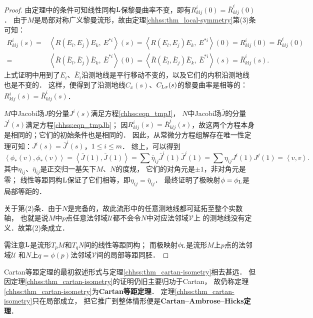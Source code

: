 \begin{proof}
     由定理中的条件可知线性同构$\rm L$保黎曼曲率不变，即有$R^i_{klj}(0)=\bar{R}^i_{klj}(0)$．
    由于$M$是{\kaishu 局部对称}广义黎曼流形，故由定理\ref{chhss:thm_local-symmetry}第(3)条可知：
    \begin{align*}
        R^i_{klj}(s)=&\left<R(E_l,E_j)E_k,\ E^{*i}\right>(s)=\left<R(E_l,E_j)E_k,\ E^{*i}\right>(0)
        =R^i_{klj}(0)=\bar{R}^i_{klj}(0) \\
        =&\left<\bar{R}(\bar{E}_l,\bar{E}_j)\bar{E}_k ,\ \bar{E}^{*i}\right>(0)
        =\left<\bar{R}(\bar{E}_l,\bar{E}_j)\bar{E}_k,\ \bar{E}^{*i}\right>(s)
        =\bar{R}^i_{klj}(s) .
    \end{align*}
    上式证明中用到了$E_i$、$\bar{E}_i$沿测地线是平行移动不变的，以及它们的内积沿测地线也是不变的．
    这样，便得到了沿测地线$C_x(s)$、$C_{{\rm L}x}(s)$的黎曼曲率是相等的：$R^i_{klj}(s)=\bar{R}^i_{klj}(s)$．
    
     $M$中Jacobi场$J$的分量$J^i(s)$满足方程\eqref{chhss:eqn_tmpJ}，
    $N$中Jacobi场$\bar{J}$的分量$\bar{J}^i(s)$满足方程\eqref{chhss:eqn_tmpJb}；
    因$R^i_{klj}(s)=\bar{R}^i_{klj}(s)$，故这两个方程本身是相同的；它们的初始条件也是相同的．
    因此，从常微分方程组解存在唯一性定理可知：$J^i(s)=\bar{J}^i(s)$，$1\leqslant i \leqslant m$．
    综上，可以得到
    \begin{equation*}
        \left<\phi_{*} (v),\phi_{*} (v)\right>  =\left<\bar{J}(1),\bar{J}(1)\right>
        =\sum \bar{\eta}_{ij} \bar{J}^i(1)\bar{J}^j(1) =\sum \eta_{ij} J^i(1)J^j(1)
        =\left<v,v\right> .
    \end{equation*}  %
    其中$\eta_{ij}$、$\bar{\eta}_{ij}$是正交归一基矢下$M$、$N$的度规，
    它们的对角元是$\pm 1$，非对角元是零；
    线性等距同构$\rm L$保证了它们相等，即$\eta_{ij}=\bar{\eta}_{ij}$．
    最终证明了极映射$\phi=\phi_{{\rm L}}$是局部等距的．
    
    
     关于第(2)条．由于$N$是完备的，故此流形中的任意测地线都可延拓至整个实数轴，
    也就是说$M$中$p$点任意法邻域$\mathscr{U}$都不会令$N$中对应法邻域$\mathscr{V}$上
    的测地线没有定义．故第(2)条成立．
    
    需注意$\rm L$是流形$T_p M$和$T_q N$间的线性等距同构；
    而极映射$\phi_{{\rm L}}$是流形$M$上$p$点的法邻域$\mathscr{U}$
    和$N$上$q=\phi(p)$法邻域$\mathscr{V}$间的局部等距同胚．
\end{proof}


Cartan等距定理的最初叙述形式与定理\ref{chhss:thm_cartan-isometry}相去甚远．
但因定理\ref{chhss:thm_cartan-isometry}的证明仍旧主要归功于Cartan，
故仍称定理\ref{chhss:thm_cartan-isometry}为{\bfseries\heiti Cartan等距定理}．
定理\ref{chhss:thm_cartan-isometry}只在局部成立，
把它推广到整体情形便是{\bfseries\heiti Cartan--Ambrose--Hicks定理}．

